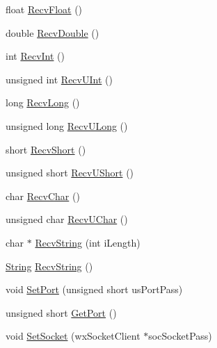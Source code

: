 \begin{DoxyCompactItemize}
float \hyperlink{class_rad_j_a_v_1_1_networking_1_1wx_widgets_t_c_p_client_accbbc7a429265395c0aaa0e55120ab36}{Recv\+Float} ()
\item 
double \hyperlink{class_rad_j_a_v_1_1_networking_1_1wx_widgets_t_c_p_client_a5fe45956f526465748febd1dfbf1a738}{Recv\+Double} ()
\item 
int \hyperlink{class_rad_j_a_v_1_1_networking_1_1wx_widgets_t_c_p_client_ad80311f3c9bfb5e6d3f432b4227bc65a}{Recv\+Int} ()
\item 
unsigned int \hyperlink{class_rad_j_a_v_1_1_networking_1_1wx_widgets_t_c_p_client_a512b03c1611b5d2a808be6e9908be745}{Recv\+U\+Int} ()
\item 
long \hyperlink{class_rad_j_a_v_1_1_networking_1_1wx_widgets_t_c_p_client_a33ec446384ae86b928dfd92793f671af}{Recv\+Long} ()
\item 
unsigned long \hyperlink{class_rad_j_a_v_1_1_networking_1_1wx_widgets_t_c_p_client_a1ccd980056060e875f5cc680c91732e6}{Recv\+U\+Long} ()
\item 
short \hyperlink{class_rad_j_a_v_1_1_networking_1_1wx_widgets_t_c_p_client_a13eee779bf8281cadfa24f927dc02158}{Recv\+Short} ()
\item 
unsigned short \hyperlink{class_rad_j_a_v_1_1_networking_1_1wx_widgets_t_c_p_client_a80e785e8bf0473ab47f1dc906f0ac0b1}{Recv\+U\+Short} ()
\item 
char \hyperlink{class_rad_j_a_v_1_1_networking_1_1wx_widgets_t_c_p_client_a2c2ec4d4c31f46ad085ba5bde8645a53}{Recv\+Char} ()
\item 
unsigned char \hyperlink{class_rad_j_a_v_1_1_networking_1_1wx_widgets_t_c_p_client_a3b212a49fa6e35f2b15c7ed58b53188d}{Recv\+U\+Char} ()
\item 
char $\ast$ \hyperlink{class_rad_j_a_v_1_1_networking_1_1wx_widgets_t_c_p_client_a6bce2ed1b76426bbdc7fddc1c676fe57}{Recv\+String} (int i\+Length)
\item 
\hyperlink{class_rad_j_a_v_1_1_string}{String} \hyperlink{class_rad_j_a_v_1_1_networking_1_1wx_widgets_t_c_p_client_abd7b224de561ac1a90d1677df5243952}{Recv\+String} ()
\item 
void \hyperlink{class_rad_j_a_v_1_1_networking_1_1wx_widgets_t_c_p_client_a7a5b908897319073f06fac0a70859ce8}{Set\+Port} (unsigned short us\+Port\+Pass)
\item 
unsigned short \hyperlink{class_rad_j_a_v_1_1_networking_1_1wx_widgets_t_c_p_client_a1b51e3638dc1cefcad9926b38e6e1fdb}{Get\+Port} ()
\item 
void \hyperlink{class_rad_j_a_v_1_1_networking_1_1wx_widgets_t_c_p_client_aeb23b2c93b6be3edb631cc47778ffc84}{Set\+Socket} (wx\+Socket\+Client $\ast$soc\+Socket\+Pass)

\end{DoxyCompactItemize}
